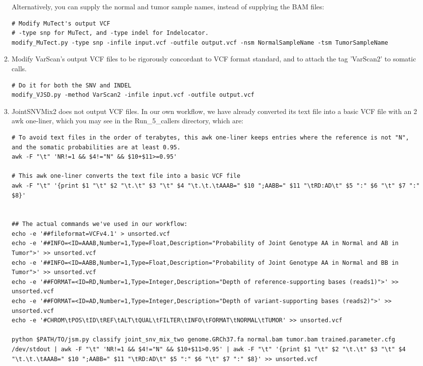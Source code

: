 \documentclass[10pt,letterpaper]{article}
\begin{document}
\begin{sloppypar}
\begin{enumerate}
Alternatively, you can supply the normal and tumor sample names, instead of supplying the BAM files:
\begin{lstlisting}
# Modify MuTect's output VCF
# -type snp for MuTect, and -type indel for Indelocator.
modify_MuTect.py -type snp -infile input.vcf -outfile output.vcf -nsm NormalSampleName -tsm TumorSampleName
\end{lstlisting}

\item
Modify VarScan's output VCF files to be rigorously concordant to VCF format standard, and to attach the tag 'VarScan2' to somatic calls. 
\begin{lstlisting}
# Do it for both the SNV and INDEL
modify_VJSD.py -method VarScan2 -infile input.vcf -outfile output.vcf
\end{lstlisting}
	

\item
JointSNVMix2 does not output VCF files. In our own workflow, we have already converted its text file into a basic VCF file with an 2 awk one-liner, which you may see in the Run\_5\_callers directory, which are:

\begin{lstlisting}
# To avoid text files in the order of terabytes, this awk one-liner keeps entries where the reference is not "N", and the somatic probabilities are at least 0.95.
awk -F "\t" 'NR!=1 && $4!="N" && $10+$11>=0.95'
	
# This awk one-liner converts the text file into a basic VCF file
awk -F "\t" '{print $1 "\t" $2 "\t.\t" $3 "\t" $4 "\t.\t.\tAAAB=" $10 ";AABB=" $11 "\tRD:AD\t" $5 ":" $6 "\t" $7 ":" $8}'


## The actual commands we've used in our workflow:
echo -e '##fileformat=VCFv4.1' > unsorted.vcf
echo -e '##INFO=<ID=AAAB,Number=1,Type=Float,Description="Probability of Joint Genotype AA in Normal and AB in Tumor">' >> unsorted.vcf
echo -e '##INFO=<ID=AABB,Number=1,Type=Float,Description="Probability of Joint Genotype AA in Normal and BB in Tumor">' >> unsorted.vcf
echo -e '##FORMAT=<ID=RD,Number=1,Type=Integer,Description="Depth of reference-supporting bases (reads1)">' >> unsorted.vcf
echo -e '##FORMAT=<ID=AD,Number=1,Type=Integer,Description="Depth of variant-supporting bases (reads2)">' >> unsorted.vcf
echo -e '#CHROM\tPOS\tID\tREF\tALT\tQUAL\tFILTER\tINFO\tFORMAT\tNORMAL\tTUMOR' >> unsorted.vcf

python $PATH/TO/jsm.py classify joint_snv_mix_two genome.GRCh37.fa normal.bam tumor.bam trained.parameter.cfg /dev/stdout | awk -F "\t" 'NR!=1 && $4!="N" && $10+$11>0.95' | awk -F "\t" '{print $1 "\t" $2 "\t.\t" $3 "\t" $4 "\t.\t.\tAAAB=" $10 ";AABB=" $11 "\tRD:AD\t" $5 ":" $6 "\t" $7 ":" $8}' >> unsorted.vcf
\end{lstlisting}
	

\end{enumerate}
\end{sloppypar}
\end{document}
